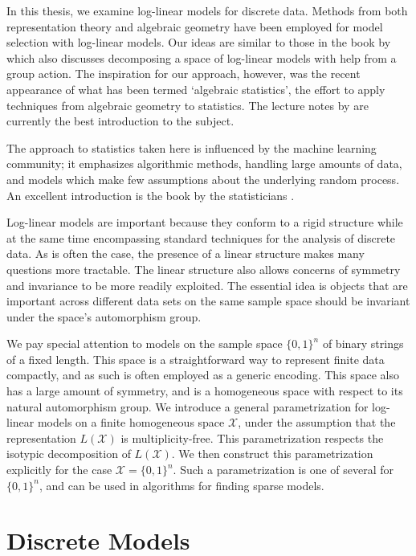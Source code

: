 \documentclass[cclicense]{hmcthesis}
\providecommand*{\xs}{\mathcal X}
\numberwithin{equation}{chapter}
\numberwithin{thmcounter}{chapter}
\begin{document}
    In this thesis, we examine log-linear models for discrete data.  Methods
    from both representation theory and algebraic geometry have been employed
    for model selection with log-linear models.  Our ideas are similar to those
    in the book by \citet{GRPS} which also discusses decomposing a space of
    log-linear models with help from a group action.  The inspiration for our
    approach, however, was the recent appearance of what has been termed
    `algebraic statistics', the effort to apply techniques from algebraic
    geometry to statistics.  The lecture notes by \citet{DSS08} are currently
    the best introduction to the subject.  
    
    The approach to statistics taken here is influenced by the machine learning
    community; it emphasizes algorithmic methods, handling large amounts of
    data, and models which make few assumptions about the underlying random
    process.  An excellent introduction is the book by the statisticians
    \citet{EOSL}.  
    
    Log-linear models are important because they conform to a rigid structure
    while at the same time encompassing standard techniques for the analysis of
    discrete data.  As is often the case, the presence of a linear structure
    makes many questions more tractable.  The linear structure also allows
    concerns of symmetry and invariance to be more readily exploited.  The
    essential idea is objects that are important across different data sets on
    the same sample space should be invariant under the space's automorphism
    group.

    We pay special attention to models on the sample space $\{0, 1\}^n$ of
    binary strings of a fixed length.  This space is a straightforward way to
    represent finite data compactly, and as such is often employed as a generic
    encoding.  This space also has a large amount of symmetry, and is a
    homogeneous space with respect to its natural automorphism group.  We
    introduce a general parametrization for log-linear models on a finite
    homogeneous space $\xs$, under the assumption that the representation
    $L(\xs)$ is multiplicity-free.  This parametrization respects the isotypic
    decomposition of $L(\xs)$.  We then construct this parametrization
    explicitly for the case $\xs = \{0, 1\}^n$.  Such a parametrization is one
    of several for $\{0, 1\}^n$, and can be used in algorithms for finding
    sparse models.


\chapter{Discrete Models}
\end{document}
